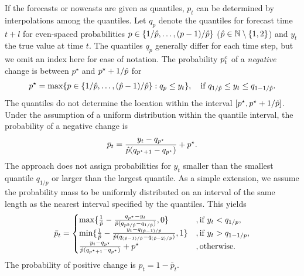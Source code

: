 If the forecasts or nowcasts are given as quantiles, $p_t$ can be determined by interpolations among the quantiles.
Let $q_p$ denote the quantiles for forecast time $t+l$ for even-spaced probabilities $p \in \{1/\hat{p}, \dots, (p-1) / \hat{p}\}$ ($\hat{p} \in \mathbb{N} \setminus \{1, 2\}$) and $y_t$ the true value at time $t$.
The quantiles $q_p$ generally differ for each time step, but we omit an index here for ease of notation.
The probability $p^c_t$ of a \textit{negative} change is between $p^{\star}$ and $p^{\star} + 1/\hat{p}$ for
\begin{equation*}
    p^{\star} = \max \{p \in \{1/\hat{p}, \dots, (\hat{p}-1) / \hat{p}\}: q_p \leq y_t\} , \quad \text{if}\ q_{1/\hat{p}} \leq y_t \leq q_{1 - 1/\hat{p}}.
\end{equation*}
The quantiles do not determine the location within the interval $[p^{\star}, p^{\star} + 1/\hat{p}]$.
Under the assumption of a uniform distribution within the quantile interval, the probability of a negative change is
\begin{equation*}
    \bar{p}_t = \frac{y_t - q_{p^\star}}{\hat{p} (q_{p^{\star} + 1} - q_{p^{\star}})} + p^{\star}.
\end{equation*}
The approach does not assign probabilities for $y_t$ smaller than the smallest quantile $q_{1/p}$ or larger than the largest quantile.
As a simple extension, we assume the probability mass to be uniformly distributed on an interval of the same length as the nearest interval specified by the quantiles.
This yields
\begin{equation*}
\bar{p}_t = \begin{cases}
    \max \{\frac{1}{\hat{p}} - \frac{q_{p^\star} - y_t}{\hat{p} (q_{p2/\hat{p}} - q_{1/\hat{p}})}, 0\} &, \text{if } y_t < q_{1/p}, \\
    \min \{\frac{1}{\hat{p}} - \frac{y_t - q_{(\hat{p}-1)/\hat{p}}}{\hat{p} (q_{(\hat{p}-1)/\hat{p}} - q_{(\hat{p}-2)/\hat{p}})}, 1\} &, \text{if } y_t > q_{1 - 1/p}, \\
    \frac{y_t - q_{p^\star}}{\hat{p} (q_{p^{\star} + 1} - q_{p^{\star}})} + p^{\star} &, \text{otherwise.}
\end{cases}
\end{equation*}
The probability of positive change is $p_t = 1 - \bar{p}_t$.

